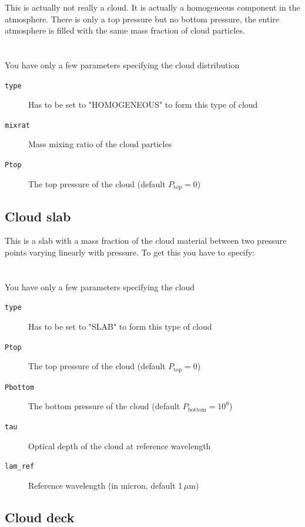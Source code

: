 \documentclass[12pt]{article}
\begin{document}
This is actually not really a cloud. It is actually a homogeneous component in the atmosphere. There is only a top pressure but no bottom pressure, the entire atmosphere is filled with the same mass fraction of cloud particles.
\\
\\
\\
You have only a few parameters specifying the cloud distribution

\begin{description}
\item[\texttt{type}]
Has to be set to "HOMOGENEOUS" to form this type of cloud
\item[\texttt{mixrat}]
Mass mixing ratio of the cloud particles
\item[\texttt{Ptop}]
The top pressure of the cloud (default $P_\mathrm{top}=0$)
\end{description}


\subsection{Cloud slab}

This is a slab with a mass fraction of the cloud material between two pressure points varying linearly with pressure. To get this you have to specify:
\\
\\
\\
You have only a few parameters specifying the cloud

\begin{description}
\item[\texttt{type}]
Has to be set to "SLAB" to form this type of cloud
\item[\texttt{Ptop}]
The top pressure of the cloud (default $P_\mathrm{top}=0$)
\item[\texttt{Pbottom}]
The bottom pressure of the cloud (default $P_\mathrm{bottom}=10^9$)
\item[\texttt{tau}]
Optical depth of the cloud at reference wavelength
\item[\texttt{lam\_ref}]
Reference wavelength (in micron, default 1\,$\mu$m)
\end{description}

\subsection{Cloud deck}
\end{document}
